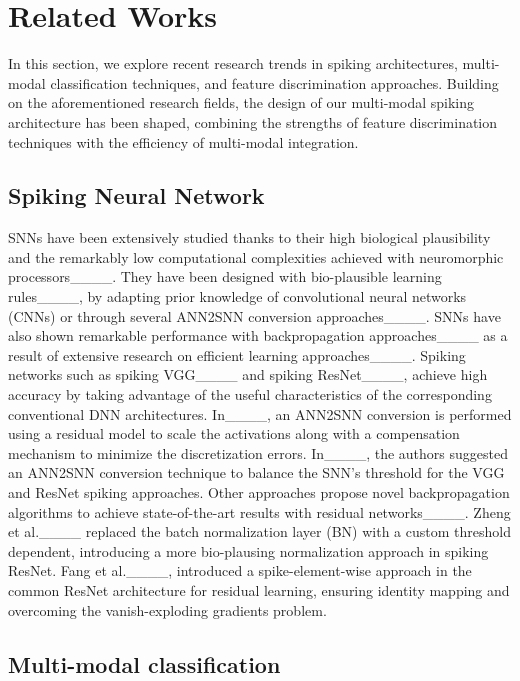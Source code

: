 \section{Related Works}
In this section, we explore recent research trends in spiking architectures, multi-modal classification techniques, and feature discrimination approaches.
Building on the aforementioned research fields, the design of our multi-modal spiking architecture has been shaped, combining the strengths of feature discrimination techniques with the efficiency of multi-modal integration.

\subsection{Spiking Neural Network}

SNNs have been extensively studied thanks to their high biological plausibility and the remarkably low computational complexities achieved with neuromorphic processors____. 
They have been designed with bio-plausible learning rules____, by adapting prior knowledge of convolutional neural networks (CNNs) or through several ANN2SNN conversion approaches____.
SNNs have also shown remarkable performance with backpropagation approaches____ as a result of extensive research on efficient learning approaches____.
Spiking networks such as spiking VGG____ and spiking ResNet____, achieve high accuracy by taking advantage of the useful characteristics of the corresponding conventional DNN architectures.
In____, an ANN2SNN conversion is performed using a residual model to scale the activations along with a compensation mechanism to minimize the discretization errors.
In____, the authors suggested an ANN2SNN conversion technique to balance the SNN's threshold for the VGG and ResNet spiking approaches. 
Other approaches propose novel backpropagation algorithms to achieve state-of-the-art results with residual networks____.
Zheng et al.____ replaced the batch normalization layer (BN) with a custom threshold dependent, introducing a more bio-plausing normalization approach in spiking ResNet.
Fang et al.____, introduced a spike-element-wise approach in the common ResNet architecture for residual learning, ensuring identity mapping and overcoming the vanish-exploding gradients problem.



\subsection{Multi-modal classification}

